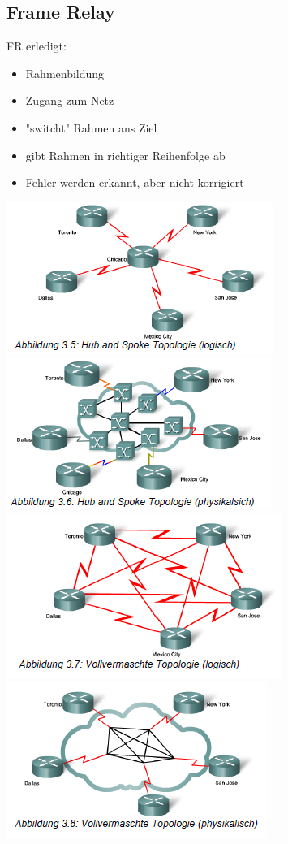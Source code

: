 \documentclass[landscape,twocolumn,a4paper]{article}
\begin{document}
\begin{footnotesize}
\section{Frame Relay}
FR erledigt:
\vspace{-3mm}
\begin{itemize}
	\item Rahmenbildung
	\item Zugang zum Netz
	\item "switcht" Rahmen ans Ziel
	\item gibt Rahmen in richtiger Reihenfolge ab
	\item Fehler werden erkannt, aber nicht korrigiert
\end{itemize}
\includegraphics[scale=0.3]{hub-spoke-logisch.png}
\includegraphics[scale=0.3]{hub-spoke-physikalisch.png}
\includegraphics[scale=0.3]{vollvermascht-logisch.png}
\includegraphics[scale=0.3]{vollvermascht-physikalisch.png}


\end{footnotesize}
\end{document}
